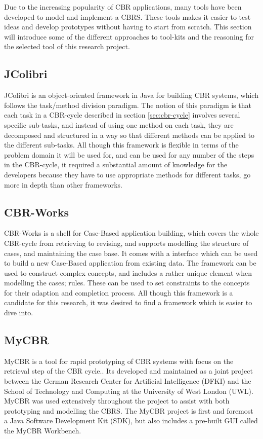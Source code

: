 Due to the increasing popularity of CBR applications\cite{kolodner2014case}, many tools have been developed to model and implement a CBRS. These tools makes it easier to test ideas and develop prototypes without having to start from scratch. This section will introduce some of the different approaches to tool-kits and the reasoning for the selected tool of this research project. 

\subsection{JColibri}
JColibri is an object-oriented framework in Java for building CBR systems, which follows the task/method division paradigm.\cite{bello2004jcolibri} The notion of this paradigm is that each task in a CBR-cycle described in section \ref{sec:cbr-cycle} involves several specific sub-tasks, and instead of using one method on each task, they are decomposed and structured in a way so that different methods can be applied to the different sub-tasks. All though this framework is flexible in terms of the problem domain it will be used for, and can be used for any number of the steps in the CBR-cycle, it required a substantial amount of knowledge for the developers because they have to use appropriate methods for different tasks, go more in depth than other frameworks.


\subsection{CBR-Works}
CBR-Works is a shell for Case-Based application building, which covers the whole CBR-cycle from retrieving to revising, and supports modelling the structure of cases, and maintaining the case base.\cite{schulz1999cbr} It comes with a interface which can be used to build a new Case-Based application from existing data. The framework can be used to construct complex concepts, and includes a rather unique element when modelling the cases; rules. These can be used to set constraints to the concepts for their adaption and completion process. All though this framework is a candidate for this research, it was desired to find a framework which is easier to dive into.

\subsection{MyCBR}
MyCBR is a tool for rapid prototyping of CBR systems with focus on the retrieval step of the CBR cycle.\cite{MyCBR}. Its developed and maintained as a joint project between the German Research Center for Artificial Intelligence (DFKI) and the School of Technology and Computing at the University of West London (UWL)\cite{Stahl2008}. MyCBR was used extensively throughout the project to assist with both prototyping and modelling the CBRS. The MyCBR project is first and foremost a Java Software Development Kit (SDK), but also includes a pre-built GUI called the MyCBR Workbench. 

